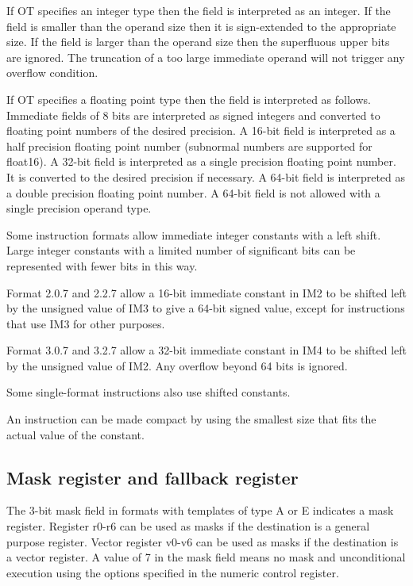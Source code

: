 \documentclass[forwardcom.tex]{subfiles}
\begin{document}
If OT specifies an integer type then the field is interpreted as an integer. If the field is smaller than the operand size then it is sign-extended to the appropriate size. If the field is larger than the operand size then the superfluous upper bits are ignored. The truncation of a too large immediate operand will not trigger any overflow condition.
\vv

If OT specifies a floating point type then the field is interpreted as follows. Immediate fields of 8 bits are interpreted as signed integers and converted to floating point numbers of the desired precision. A 16-bit field is interpreted as a half precision floating point number (subnormal numbers are supported for float16). 
A 32-bit field is interpreted as a single precision floating point number. It is converted to the desired precision if necessary. A 64-bit field is interpreted as a double precision floating point number. A 64-bit field is not allowed with a single precision operand type.
\vv

Some instruction formats allow immediate integer constants with a left shift. Large integer constants with a limited number of significant bits can be represented with fewer bits in this way.

Format 2.0.7 and 2.2.7 allow a 16-bit immediate constant in IM2 to be shifted left by the unsigned value of IM3 to give a 64-bit signed value, except for instructions that use IM3 for other purposes.

Format 3.0.7 and 3.2.7 allow a 32-bit immediate constant in IM4 to be shifted left by the unsigned value of IM2.
Any overflow beyond 64 bits is ignored.

Some single-format instructions also use shifted constants.
\vv

An instruction can be made compact by using the smallest size that fits the actual value of the constant.


\subsection{Mask register and fallback register} \label{MaskAndFallback}
The 3-bit mask field in formats with templates of type A or E indicates a mask register. Register r0-r6 can be used as masks if the destination is a general purpose register. Vector register v0-v6 can be used as masks if the destination is a vector register. A value of 7 in the mask field means no mask and unconditional execution using the options specified in the numeric control register.
\vv
\end{document}
